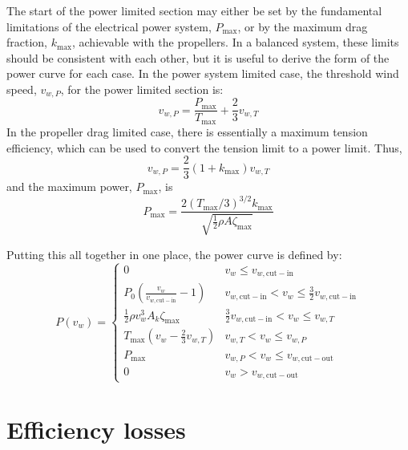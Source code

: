 \documentclass[11pt]{amsart}
\newcommand{\cutin}{\mathrm{cut-in}}
\newcommand{\cutout}{\mathrm{cut-out}}
\newcommand{\kite}{k}
\newcommand{\wind}{w}
\begin{document}
The start of the power limited section may either be set by the
fundamental limitations of the electrical power system, $P_{\max}$, or
by the maximum drag fraction, $k_{\max}$, achievable with the
propellers.  In a balanced system, these limits should be consistent
with each other, but it is useful to derive the form of the power
curve for each case.  In the power system limited case, the threshold
wind speed, $v_{\wind,P}$, for the power limited section is:
%
\begin{equation}
v_{\wind,P} = \frac{P_{\max}}{T_{\max}} + \frac{2}{3} v_{\wind,T}
\end{equation}
%
In the propeller drag limited case, there is essentially a maximum
tension efficiency, which can be used to convert the tension limit to
a power limit.  Thus,
%
\begin{equation}
v_{\wind,P} = \frac{2}{3} (1 + k_{\max}) v_{\wind,T}
\end{equation}
%
and the maximum power, $P_{\max}$, is
%
\begin{equation}
P_{\max} = \frac{2 (T_{\max} / 3)^{3/2} k_{\max}}{ \sqrt{\frac{1}{2} \rho A \zeta_{\max}}}
\end{equation}

Putting this all together in one place, the power curve is defined by:
%
\begin{equation}
P(v_{\wind}) =
\begin{cases}
  0 &
  v_{\wind} \le v_{\wind,\cutin} \\

  P_0 \left(\frac{v_{\wind}}{v_{\wind,\cutin}} - 1 \right) &
  v_{\wind,\cutin} < v_{\wind} \le \frac{3}{2} v_{\wind,\cutin} \\

  \frac{1}{2} \rho v_{\wind}^3 A_{\kite} \zeta_{\max} &
  \frac{3}{2} v_{\wind,\cutin} < v_{\wind} \le v_{\wind,T} \\

  T_{\max} \left( v_{\wind} - \frac{2}{3} v_{\wind,T} \right) &
  v_{\wind,T} < v_{\wind} \le v_{\wind,P} \\

  P_{\max} &
  v_{\wind,P} < v_{\wind} \le v_{\wind,\cutout} \\

  0 &
  v_{\wind} > v_{\wind,\cutout}
\end{cases}
\end{equation}


\section{Efficiency losses}
\end{document}
